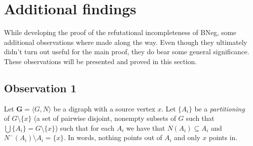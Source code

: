 \section{Additional findings}
\label{sec:Additional findings}
While developing the proof of the refutational incompleteness of BNeg, some additional observations where made along the way.
Even though they ultimately didn't turn out useful for the main proof, they do bear some general significance.
These observations will be presented and proved in this section.

\subsection{Observation 1}
\label{sub:Observation 1}
Let $\mathbf{G} = \langle G,N \rangle$ be a digraph with a source vertex $x$.
Let $\{A_i\}$ be a \textit{partitioning} of $G \setminus \{ x \}$ (a set of pairwise disjoint, nonempty subsets of $G$ such that $\bigcup \{A_i\} = G \setminus \{ x \}$) such that for each $A_i$ we have that $N(A_i) \subseteq A_i$ and $N^-(A_i) \setminus A_i = \{ x \}$.
In words, nothing points out of $A_i$ and only $x$ points in.

